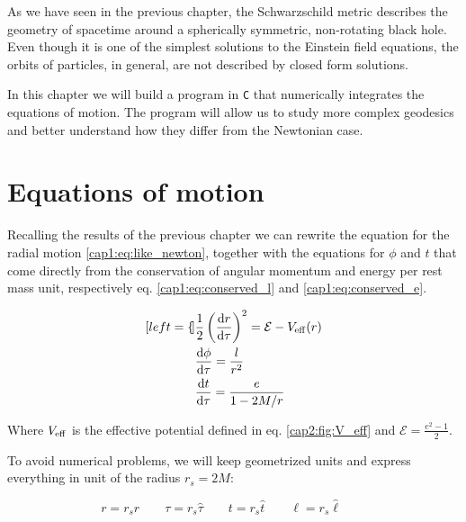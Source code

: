 
As we have seen in the previous chapter, the Schwarzschild metric describes the
geometry of spacetime around a spherically symmetric, non-rotating black hole.
Even though it is one of the simplest solutions to the Einstein field equations,
the orbits of particles, in general, are not described by closed form solutions.

In this chapter we will build a program in \texttt{C} that numerically
integrates the equations of motion.
The program will allow us to study more complex geodesics and better understand
how they differ from the Newtonian case.


\section{Equations of motion}
\label{cap2:sec:eq_of_motion}

Recalling the results of the previous chapter we can rewrite the equation for
the radial motion \ref{cap1:eq:like_newton}, together with the equations for
$\phi$ and $t$ that come directly from the conservation of angular momentum and
energy per rest mass unit, respectively eq. \ref{cap1:eq:conserved_l} and
\ref{cap1:eq:conserved_e}.

\begin{subequations}
\label{cap2:eq:eq_of_motion}
	\begin{align}[left = {\empheqlbrace}]
        &\frac{1}{2} \left(\dv{r}{\tau}\right)^2 = \mathcal E - V_{\rm eff} (r)
        \\
        &\dv{\phi}{\tau} = \frac{l}{r^2} \\
        &\dv{t}{\tau} = \frac{e}{1 - 2 M / r}
	\end{align}
\end{subequations}

Where $V_{\rm eff}$ is the effective potential defined in eq.
\ref{cap2:fig:V_eff} and $\mathcal E = \frac{e^2 - 1}{2}$.

To avoid numerical problems, we will keep geometrized units and express
everything in unit of the \Sh radius $r_s = 2 M$:

\begin{equation}
    r = r_s \hat r \quad \quad
    \tau = r_s \hat \tau \quad \quad
    t = r_s \hat t \quad \quad
    \ell = r_s \hat \ell \quad \quad
\end{equation}

